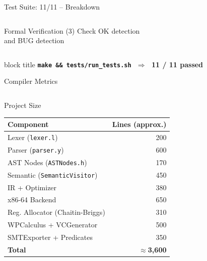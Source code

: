 \documentclass[aspectratio=169,11pt]{beamer}
\begin{document}
\begin{frame}{Test Suite: 11/11 -- Breakdown}
\begin{columns}[t]
\begin{block}{Formal Verification (3)}
    Check OK detection\\
    and BUG detection
  \end{block}
\end{columns}

\vspace{0.3cm}
\begin{beamercolorbox}[rounded=true,center,wd=0.72\textwidth]{block title}
  \centering\large\bfseries
  \texttt{make \&\& tests/run\_tests.sh}
  $\;\Rightarrow\;$ \textbf{11 / 11 passed}
\end{beamercolorbox}
\end{frame}

\begin{frame}{Compiler Metrics}
\begin{columns}[t]
  \begin{block}{Project Size}
    \small
    \begin{tabular}{lr}
      \toprule
      \textbf{Component} & \textbf{Lines (approx.)} \\
      \midrule
      Lexer (\texttt{lexer.l})             & 200  \\
      Parser (\texttt{parser.y})           & 600  \\
      AST Nodes (\texttt{ASTNodes.h})      & 170  \\
      Semantic (\texttt{SemanticVisitor})  & 450  \\
      IR + Optimizer                       & 380  \\
      x86-64 Backend                       & 650  \\
      Reg. Allocator (Chaitin-Briggs)      & 310  \\
      WPCalculus + VCGenerator             & 500  \\
      SMTExporter + Predicates             & 350  \\
      \midrule
      \textbf{Total}                       & \textbf{$\approx$3,600} \\
      \bottomrule
    \end{tabular}
  \end{block}


\end{columns}
\end{frame}
\end{document}
